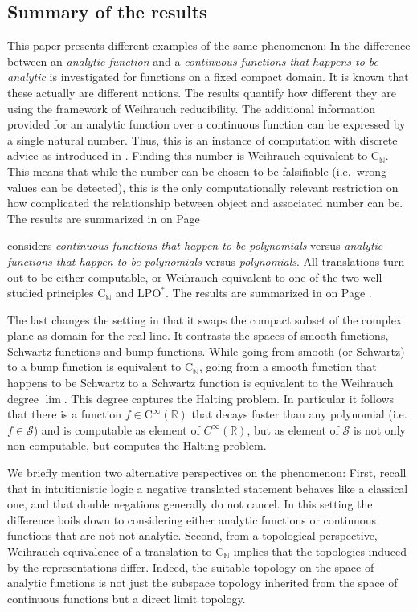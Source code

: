 \documentclass{eptcs-modified}
\newcommand{\lpo}{\textrm{LPO}}
\newcommand{\CCN}{\mathrm{C}_{\NN}}
\newcommand{\C}{\textrm{C}}
\newcommand{\NN}{\mathbb{N}}
\newcommand{\RR}{\mathbb{R}}
\newcommand{\SF}{\mathcal S}
\begin{document}
	\subsection{Summary of the results}
		This paper presents different examples of the same phenomenon:
		In  the difference between an \emph{analytic function} and a \emph{continuous functions that happens to be analytic} is investigated for functions on a fixed compact domain.
		It is known that these actually are different notions.
		The results quantify how different they are using the framework of Weihrauch reducibility.
		The additional information provided for an analytic function over a continuous function can be expressed by a single natural number.
		Thus, this is an instance of computation with discrete advice as introduced in \cite{MR2915702}.
		Finding this number is Weihrauch equivalent to $\CCN$.
		This means that while the number can be chosen to be falsifiable (i.e.~wrong values can be detected), this is the only computationally relevant restriction on how complicated the relationship between object and associated number can be.
		The results are summarized in  on Page \pageref{figure:reductions}

		 considers \emph{continuous functions that happen to be polynomials} versus \emph{analytic functions that happen to be polynomials} versus \emph{polynomials}.
		All translations turn out to be either computable, or Weihrauch equivalent to one of the two well-studied principles $\CCN$ and $\lpo^*$.
		The results are summarized in  on Page \pageref{figure:reductions for polynomials}.

		The last  changes the setting in that it swaps the compact subset of the complex plane as domain for the real line.
		It contrasts the spaces of smooth functions, Schwartz functions and bump functions.
		While going from smooth (or Schwartz) to a bump function is equivalent to $\CCN$, going from a smooth function that happens to be Schwartz to a Schwartz function is equivalent to the Weihrauch degree $\lim$.
		This degree captures the Halting problem.
		In particular it follows that there is a function $f\in\C^\infty(\RR)$ that decays faster than any polynomial (i.e. $f\in\SF$) and is computable as element of $C^\infty(\RR)$, but as element of $\SF$ is not only  non-computable, but computes the Halting problem.

		We briefly mention two alternative perspectives on the phenomenon:
		First, recall that in intuitionistic logic a negative translated statement behaves like a classical one, and that double negations generally do not cancel.
		In this setting the difference boils down to considering either analytic functions or continuous functions that are not not analytic.
		Second, from a topological perspective, Weihrauch equivalence of a translation to $\CCN$ implies that the topologies induced by the representations differ.
		Indeed, the suitable topology on the space of analytic functions is not just the subspace topology inherited from the space of continuous functions but a direct limit topology.
\end{document}
